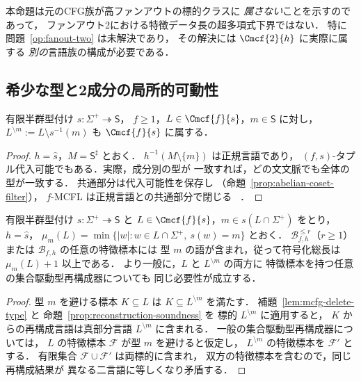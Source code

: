 \begin{remark}
本命題は元のCFG族が高ファンアウトの標的クラスに
\emph{属さない}ことを示すのであって，
ファンアウト2における特徴データ長の超多項式下界ではない．
特に問題~\ref{op:fanout-two} は未解決であり，
その解決には $\Cmcf{2}{h}$ に実際に属する
\emph{別の}言語族の構成が必要である．
\end{remark}



\subsection{希少な型と2成分の局所的可動性}
\label{subsec:rare-type-mobility}

\begin{lemma}[$h$ の型全体の削除]
\label{lem:mcfg-delete-type}
有限半群型付け $s:\Sigma^+\twoheadrightarrow\mathsf S$，
$f\ge1$，$L\in\Cmcf{f}{s}$，$m\in\mathsf S$ に対し，
$L^{\setminus m}:=L\setminus s^{-1}(m)$ も
$\Cmcf{f}{s}$ に属する．
\end{lemma}
\begin{proof}
$h=\widehat s$，$M=\mathsf S^\sharp$ とおく．
$h^{-1}(M\setminus\{m\})$ は正規言語であり，
$(f,s)$-タプル代入可能でもある．実際，成分別の型が
一致すれば，どの文文脈でも全体の型が一致する．
共通部分は代入可能性を保存し
（命題~\ref{prop:abelian-coset-filter}），
$f$-MCFL は正規言語との共通部分で閉じる
~\cite{SekiEtAl1991}．
\end{proof}

\begin{proposition}[希少な型は長い正例を強制する]
\label{prop:mcfg-rare-type-sample}
有限半群型付け $s:\Sigma^+\twoheadrightarrow\mathsf S$ と
$L\in\Cmcf{f}{s}$，$m\in s(L\cap\Sigma^+)$ をとり，
$h=\widehat s$，
$\mu_m(L)=\min\{|w|:w\in L\cap\Sigma^+,\ s(w)=m\}$ とおく．
$\mathcal B^{\le r}_{f,h}$（$r\ge1$）または
$\mathcal B_{f,h}$ の任意の特徴標本には
型 $m$ の語が含まれ，従って符号化総長は
$\mu_m(L)+1$ 以上である．
より一般に，$L$ と $L^{\setminus m}$ の両方に
特徴標本を持つ任意の集合駆動型再構成器についても
同じ必要性が成立する．
\end{proposition}
\begin{proof}
型 $m$ を避ける標本 $K\subseteq L$ は
$K\subseteq L^{\setminus m}$ を満たす．
補題~\ref{lem:mcfg-delete-type} と
命題~\ref{prop:reconstruction-soundness} を
標的 $L^{\setminus m}$ に適用すると，
$K$ からの再構成言語は真部分言語
$L^{\setminus m}$ に含まれる．
一般の集合駆動型再構成器については，
$L$ の特徴標本 $\mathcal F$ が型 $m$ を避けると仮定し，
$L^{\setminus m}$ の特徴標本を $\mathcal F'$ とする．
有限集合 $\mathcal F\cup\mathcal F'$ は両標的に含まれ，
双方の特徴標本を含むので，同じ再構成結果が
異なる二言語に等しくなり矛盾する．
\end{proof}

